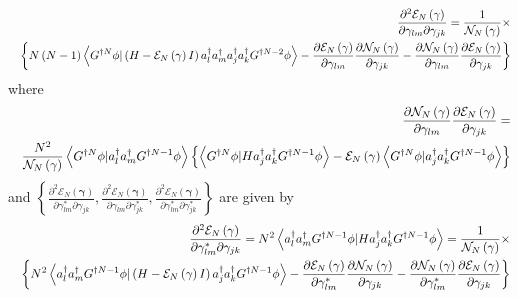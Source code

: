 \documentclass[aps,preprint]{revtex4}
\begin{document}
\begin{eqnarray}
&&\frac{\partial ^{2}\mathcal{E}_{N}\left( \mathbf{\gamma }\right) }{%
\partial \gamma _{lm}\partial \gamma _{jk}}=\frac{1}{\mathcal{N}_{N}\left( 
\mathbf{\gamma }\right) }\times  \nonumber \\
&&\left\{ N\left( N-1\right) \left\langle G^{\dagger N}\phi |\left( H-%
\mathcal{E}_{N}\left( \mathbf{\gamma }\right) I\right) a_{l}^{\dagger
}a_{m}^{\dagger }a_{j}^{\dagger }a_{k}^{\dagger }G^{\dagger N-2}\phi
\right\rangle -\frac{\partial \mathcal{E}_{N}\left( \mathbf{\gamma }\right) 
}{\partial \gamma _{lm}}\frac{\partial \mathcal{N}_{N}\left( \mathbf{\gamma }%
\right) }{\partial \gamma _{jk}}-\frac{\partial \mathcal{N}_{N}\left( 
\mathbf{\gamma }\right) }{\partial \gamma _{lm}}\frac{\partial \mathcal{E}%
_{N}\left( \mathbf{\gamma }\right) }{\partial \gamma _{jk}}\right\}
\end{eqnarray}%
where%
\begin{eqnarray}
&&\frac{\partial \mathcal{N}_{N}\left( \mathbf{\gamma }\right) }{\partial
\gamma _{lm}}\frac{\partial \mathcal{E}_{N}\left( \mathbf{\gamma }\right) }{%
\partial \gamma _{jk}}=  \nonumber \\
&&\frac{N^{2}}{\mathcal{N}_{N}\left( \mathbf{\gamma }\right) }\left\langle
G^{\dagger N}\phi |a_{l}^{\dagger }a_{m}^{\dagger }G^{\dagger N-1}\phi
\right\rangle \left\{ \left\langle G^{\dagger N}\phi |Ha_{j}^{\dagger
}a_{k}^{\dagger }G^{\dagger N-1}\phi \right\rangle -\mathcal{E}_{N}\left( 
\mathbf{\gamma }\right) \left\langle G^{\dagger N}\phi |a_{j}^{\dagger
}a_{k}^{\dagger }G^{\dagger N-1}\phi \right\rangle \right\}
\end{eqnarray}%
and $\left\{ \frac{\partial ^{2}\mathcal{E}_{N}\left( \mathbf{\gamma }%
\right) }{\partial \gamma _{lm}^{\ast }\partial \gamma _{jk}},\frac{\partial
^{2}\mathcal{E}_{N}\left( \mathbf{\gamma }\right) }{\partial \gamma
_{lm}\partial \gamma _{jk}^{\ast }},\frac{\partial ^{2}\mathcal{E}_{N}\left( 
\mathbf{\gamma }\right) }{\partial \gamma _{lm}^{\ast }\partial \gamma
_{jk}^{\ast }}\right\} $ are given by 
\begin{eqnarray}
&&\frac{\partial ^{2}\mathcal{E}_{N}\left( \mathbf{\gamma }\right) }{%
\partial \gamma _{lm}^{\ast }\partial \gamma _{jk}}=N^{2}\left\langle
a_{l}^{\dagger }a_{m}^{\dagger }G^{\dagger N-1}\phi |Ha_{j}^{\dagger
}a_{k}^{\dagger }G^{\dagger N-1}\phi \right\rangle =\frac{1}{\mathcal{N}%
_{N}\left( \mathbf{\gamma }\right) }\times  \nonumber \\
&&\left\{ N^{2}\left\langle a_{l}^{\dagger }a_{m}^{\dagger }G^{\dagger
N-1}\phi |\left( H-\mathcal{E}_{N}\left( \mathbf{\gamma }\right) I\right)
a_{j}^{\dagger }a_{k}^{\dagger }G^{\dagger N-1}\phi \right\rangle -\frac{%
\partial \mathcal{E}_{N}\left( \mathbf{\gamma }\right) }{\partial \gamma
_{lm}^{\ast }}\frac{\partial \mathcal{N}_{N}\left( \mathbf{\gamma }\right) }{%
\partial \gamma _{jk}}-\frac{\partial \mathcal{N}_{N}\left( \mathbf{\gamma }%
\right) }{\partial \gamma _{lm}^{\ast }}\frac{\partial \mathcal{E}_{N}\left( 
\mathbf{\gamma }\right) }{\partial \gamma _{jk}}\right\}
\end{eqnarray}%
\end{document}
